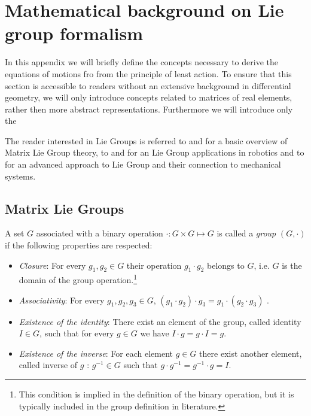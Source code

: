 \chapter{Mathematical background on Lie group formalism}
\label{liegroups}

In this appendix we will briefly define the concepts necessary to derive the equations of motions fro from the principle of least action. To ensure that this section is accessible to readers without an extensive background in differential geometry, we will only introduce concepts related to matrices of real elements, rather then more abstract representations. Furthermore we will introduce only the 

The reader interested in Lie Groups is referred to \citep{hall2003} and \citep{stillwell2008} for a basic overview of Matrix Lie Group theory, to \citep{selig2005} and \cite[Appendix]{murray1994} for an Lie Group applications in robotics and to \citep{marsden1999introduction} for an advanced approach to Lie Group and their connection to mechanical systems.  
\section{Matrix Lie Groups}
\begin{definition}[Group]
A set $G$ associated with a binary operation $\cdot : G \times G \mapsto G $ is called a \emph{group} $(G,\cdot)$ if the following properties are respected:
\begin{itemize}
    \item \emph{Closure}: For every $g_1, g_2 \in G$ their operation $g_1 \cdot g_2$ belongs to $G$, i.e. $G$ is the domain of the group operation.\footnote{This condition is implied in the definition of the binary operation, but it is typically included in the group definition in literature.}  
    \item \emph{Associativity}: For every $g_1, g_2, g_3 \in G$, $(g_1 \cdot g_2) \cdot g_3 = g_1 \cdot ( g_2 \cdot g_3) $ .
    \item \emph{Existence of the identity}: There exist an element of the group, called identity $I \in G$, such that for every $g \in G$ we have  $I \cdot g = g \cdot I = g$.
    \item \emph{Existence of the inverse}: For each element $g \in G$ there exist another element, called inverse of $g$ : $g^{-1} \in G$ such that $g \cdot g^{-1} = g^{-1} \cdot g = I$.
\end{itemize}
\end{definition}

